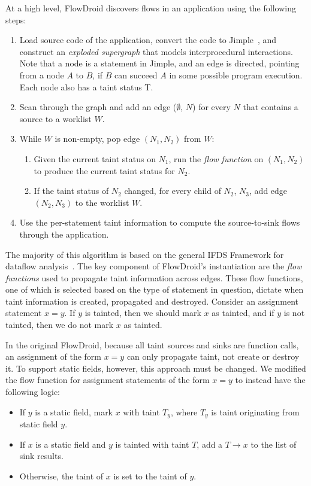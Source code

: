 At a high level, FlowDroid discovers flows in an application using the following steps:
\begin{enumerate}
\item Load source code of the application, convert the code to Jimple~\cite{soot}, and construct an \emph{exploded supergraph} that models interprocedural interactions. Note that a node is a statement in Jimple, and an edge is directed, pointing from a node $A$ to $B$, if $B$ can succeed $A$ in some possible program execution. Each node also has a taint status T.
\item Scan through the graph and add an edge ($\emptyset$, $N$) for every $N$ that contains a source to a worklist $W$.
\item While $W$ is non-empty, pop edge $(N_1, N_2)$ from $W$:
\begin{enumerate}
\item Given the current taint status on $N_1$, run the \emph{flow function} on $(N_1, N_2)$ to produce the current taint status for $N_2$.
\item If the taint status of $N_2$ changed, for every child of $N_2$, $N_3$, add edge $(N_2, N_3)$ to the worklist $W$.
\end{enumerate}
\item Use the per-statement taint information to compute the source-to-sink flows through the application.
\end{enumerate}

The majority of this algorithm is based on the general IFDS Framework for dataflow analysis~\cite{ifds}. The key component of FlowDroid's instantiation are the \emph{flow functions} used to propagate taint information across edges. These flow functions, one of which is selected based on the type of statement in question, dictate when taint information is created, propagated and destroyed. Consider an assignment statement $x = y$. If $y$ is tainted, then we should mark $x$ as tainted, and if $y$ is not tainted, then we do not mark $x$ as tainted. 

In the original FlowDroid, because all taint sources and sinks are function calls, an assignment of the form $x = y$ can only propagate taint, not create or destroy it. To support static fields, however, this approach must be changed. We modified the flow function for assignment statements of the form $x = y$ to instead have the following logic:

\begin{itemize}
\item If $y$ is a static field, mark $x$ with taint $T_y$, where $T_y$ is taint originating from static field $y$.
\item If $x$ is a static field and $y$ is tainted with taint $T$, add a $T\rightarrow x$ to the list of sink results.
\item Otherwise, the taint of $x$ is set to the taint of $y$.
\end{itemize}

